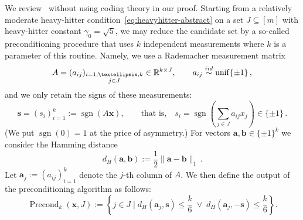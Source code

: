 \documentclass[12pt]{article}
\theoremstyle{plain}
\theoremstyle{definition}
\DeclareMathOperator{\Uniform}{unif}
\newcommand{\iid}{\stackrel{\textup{iid}}{\sim}}
\DeclareMathOperator{\sgn}{sgn}
\renewcommand{\vec}{\boldsymbol}
\newcommand{\R}{{\mathbb R}}
\DeclareMathOperator{\precond}{Precond}
\begin{document}
We review~\cite[Lem~49]{LNW18} without using coding theory in our proof.
Starting from a relatively moderate heavy-hitter condition~\eqref{eq:heavyhitter-abstract} on a set $J \subseteq [m]$ with heavy-hitter constant $\gamma_0 = \sqrt{5}$,
we may reduce the candidate set by a so-called preconditioning procedure that uses $k$ independent measurements 
where $k$ is a parameter of this routine.
Namely, we use a Rademacher measurement matrix
\begin{equation*}
    A = (a_{ij})_{\substack{i=1,\ldots,k\\j \in J}} \in \R^{k \times J},
    \qquad a_{ij} \iid \Uniform\{\pm 1\} \,,
\end{equation*}
and we only retain the signs of these measurements:
\begin{equation*}
    \vec{s} = (s_i)_{i=1}^{k} := \sgn(A\vec{x}),
    \qquad\text{that is,}\quad
    s_i = \sgn\left(\sum_{j \in J} a_{ij} x_{j}\right) \in \{\pm 1\} \,.
\end{equation*}
(We put $\sgn(0) = 1$ at the price of asymmetry.)
For vectors $\vec{a},\vec{b} \in \{\pm1\}^k$ we consider the Hamming distance
\begin{equation*}
    d_H(\vec{a},\vec{b}) := \frac{1}{2} \|\vec{a}-\vec{b}\|_{1} \,.
\end{equation*}
Let $\vec{a}_j := (a_{ij})_{i=1}^k$ denote the $j$-th column of $A$.
We then define the output of the preconditioning algorithm as follows:
\begin{equation*}
    \precond_{k}(\vec{x},J)
        := \left\{j \in J \mid d_H(\vec{a}_j,\vec{s})\leq \frac{k}{6} \;\vee\;
                                d_H(\vec{a}_j,-\vec{s})\leq \frac{k}{6}
            \right\} .
\end{equation*}
\end{document}
